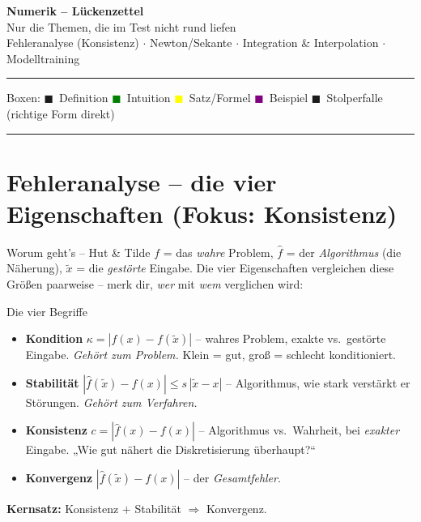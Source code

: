 \documentclass[a4paper,11pt]{article}
\begin{document}
\begin{center}
{\Huge\bfseries\color{accent} Numerik -- Lückenzettel}\\[4pt]
{\large\color{fgtext} Nur die Themen, die im Test nicht rund liefen}\\[3pt]
{\small\color{muted} Fehleranalyse (Konsistenz) $\cdot$ Newton/Sekante $\cdot$ Integration \& Interpolation $\cdot$ Modelltraining}
\end{center}
\vspace{2pt}
\noindent\textcolor{rulecol}{\rule{\linewidth}{0.4pt}}

{\small\color{muted} Boxen:\;
\textcolor{accent}{$\blacksquare$}~Definition \;
\textcolor{green}{$\blacksquare$}~Intuition \;
\textcolor{yellow}{$\blacksquare$}~Satz/Formel \;
\textcolor{purple}{$\blacksquare$}~Beispiel \;
\textcolor{rose}{$\blacksquare$}~Stolperfalle (richtige Form direkt)}

{\color{muted}\tableofcontents}
\vspace{2pt}
\noindent\textcolor{rulecol}{\rule{\linewidth}{0.4pt}}

\section{Fehleranalyse -- die vier Eigenschaften (Fokus: Konsistenz)}

\begin{intu}{Worum geht's -- Hut \& Tilde}
$f$ = das \emph{wahre} Problem, $\hat f$ = der \emph{Algorithmus} (die Näherung), $\tilde x$ = die
\emph{gestörte} Eingabe. Die vier Eigenschaften vergleichen diese Größen paarweise -- merk dir,
\emph{wer} mit \emph{wem} verglichen wird:
\end{intu}

\begin{defi}{Die vier Begriffe}
\begin{itemize}
\item \textbf{Kondition} $\kappa=|f(x)-f(\tilde x)|$ -- wahres Problem, exakte vs.\ gestörte Eingabe.
  \emph{Gehört zum Problem.} Klein = gut, groß = schlecht konditioniert.
\item \textbf{Stabilität} $|\hat f(\tilde x)-\hat f(x)|\le s\,|\tilde x-x|$ -- Algorithmus, wie stark
  verstärkt er Störungen. \emph{Gehört zum Verfahren.}
\item \textbf{Konsistenz} $c=|\hat f(x)-f(x)|$ -- Algorithmus vs.\ Wahrheit, bei \emph{exakter}
  Eingabe. „Wie gut nähert die Diskretisierung überhaupt?``
\item \textbf{Konvergenz} $|\hat f(\tilde x)-f(x)|$ -- der \emph{Gesamtfehler}.
\end{itemize}
\textbf{Kernsatz:} Konsistenz $+$ Stabilität $\Rightarrow$ Konvergenz.
\end{defi}
\end{document}

